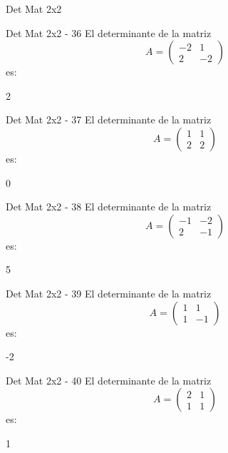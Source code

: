 \documentclass[a4,11pt]{aleph-notas}
\begin{document}
\begin{quiz}{Det Mat 2x2}
\begin{numerical}[tolerance=0]%
    {Det Mat 2x2 - 36}
    El determinante de la matriz
    \[
        A = \begin{pmatrix} -2 & 1 \\ 2 & -2 \end{pmatrix}
    \]
    es:
    \item[] 2
\end{numerical}

\begin{numerical}[tolerance=0]%
    {Det Mat 2x2 - 37}
    El determinante de la matriz
    \[
        A = \begin{pmatrix} 1 & 1 \\ 2 & 2 \end{pmatrix}
    \]
    es:
    \item[] 0
\end{numerical}

\begin{numerical}[tolerance=0]%
    {Det Mat 2x2 - 38}
    El determinante de la matriz
    \[
        A = \begin{pmatrix} -1 & -2 \\ 2 & -1 \end{pmatrix}
    \]
    es:
    \item[] 5
\end{numerical}

\begin{numerical}[tolerance=0]%
    {Det Mat 2x2 - 39}
    El determinante de la matriz
    \[
        A = \begin{pmatrix} 1 & 1 \\ 1 & -1 \end{pmatrix}
    \]
    es:
    \item[] -2
\end{numerical}

\begin{numerical}[tolerance=0]%
    {Det Mat 2x2 - 40}
    El determinante de la matriz
    \[
        A = \begin{pmatrix} 2 & 1 \\ 1 & 1 \end{pmatrix}
    \]
    es:
    \item[] 1
\end{numerical}


\end{quiz}
\end{document}
